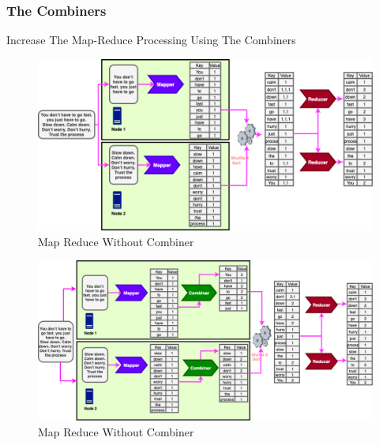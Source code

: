 \begin{frame}[c]{ }
	\frametitle{ The Combiners}
	\centering     
	
	\textcolor{offgreen}{ \large Increase The Map-Reduce Processing Using The Combiners}
\end{frame}
\begin{frame}
	
	\begin{figure}
		\includegraphics[height=.85\textheight]{./Figures/chapter-02/map-reduce-combiner-ex-1.png}
		\caption{Map Reduce Without Combiner } \label{fig:MRCombiner1}
	\end{figure}			
\end{frame}
\begin{frame}
	
	\begin{figure}
		\includegraphics[height=.85\textheight]{./Figures/chapter-02/map-reduce-combiner-ex-2.png}
		\caption{Map Reduce Without Combiner } \label{fig:MRCombiner2}
	\end{figure}			
\end{frame}